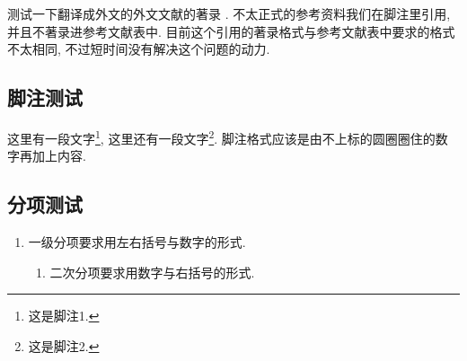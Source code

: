 测试一下翻译成外文的外文文献的著录 \cite{sally_history_1985}. 不太正式的参考资料我们在脚注里引用, 并且不著录进参考文献表中. 目前这个引用的著录格式与参考文献表中要求的格式不太相同, 不过短时间没有解决这个问题的动力.

\zhlipsum[1]

\subsection{脚注测试}

这里有一段文字\footnote{这是脚注1.}, 这里还有一段文字\footnote{这是脚注2.}. 脚注格式应该是由不上标的圆圈圈住的数字再加上内容.

\zhlipsum

\subsection{分项测试}

\begin{enumerate}
  \item 一级分项要求用左右括号与数字的形式.
  \begin{enumerate}
    \item 二次分项要求用数字与右括号的形式.
  \end{enumerate}
\end{enumerate}

\zhlipsum[1]
